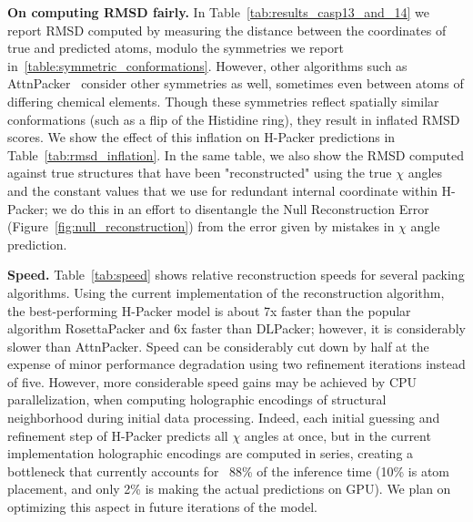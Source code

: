 \textbf{On computing RMSD fairly.} In Table~\ref{tab:results_casp13_and_14} we report RMSD computed
by measuring the distance between the coordinates of true and predicted atoms, modulo the
symmetries we report in~\ref{table:symmetric_conformations}. However, other algorithms such as
AttnPacker~\citep{mcpartlon_end--end_2023} consider other symmetries as well, sometimes even
between atoms of differing chemical elements. Though these symmetries reflect spatially similar
conformations (such as a flip of the Histidine ring), they result in inflated RMSD scores. We show
the effect of this inflation on H-Packer predictions in Table~\ref{tab:rmsd_inflation}. In the same
table, we also show the RMSD computed against true structures that have been "reconstructed" using
the true $\chi$ angles and the constant values that we use for redundant internal coordinate within
H-Packer; we do this in an effort to disentangle the Null Reconstruction Error
(Figure~\ref{fig:null_reconstruction}) from the error given by mistakes in $\chi$ angle prediction.

\textbf{Speed.} Table~\ref{tab:speed} shows relative reconstruction speeds for several packing
algorithms. Using the current implementation of the reconstruction algorithm, the best-performing
H-Packer model is about 7x faster than the popular algorithm RosettaPacker and 6x faster than
DLPacker; however, it is considerably slower than AttnPacker. Speed can be considerably cut down by
half at the expense of minor performance degradation using two refinement iterations instead of
five. However, more considerable speed gains may be achieved by CPU parallelization, when computing
 holographic encodings of structural neighborhood during initial data processing. Indeed, each
initial guessing and refinement step of H-Packer predicts all $\chi$ angles at once, but in the
current implementation holographic encodings are computed in series, creating a bottleneck that
currently accounts for ~88\% of the inference time (10\% is atom placement, and only 2\% is making
the actual predictions on GPU). We plan on optimizing this aspect in future iterations of the model.

